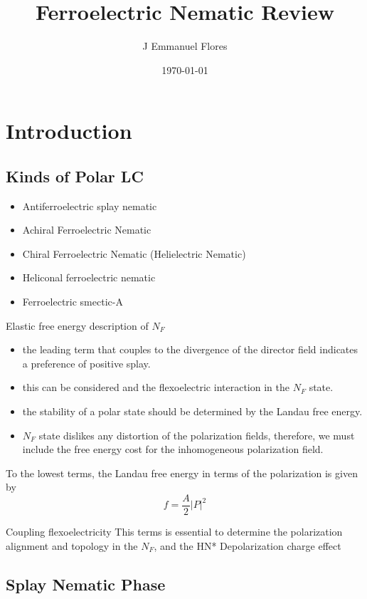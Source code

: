 \documentclass{article}
\title{Ferroelectric Nematic Review}
\author{J Emmanuel Flores}
\date{\today}
\begin{document}
\maketitle

\section{Introduction}
\subsection{Kinds of Polar LC \cite{zou2024extended}}
\begin{itemize}
    \item Antiferroelectric splay nematic
    \item Achiral Ferroelectric Nematic
    \item Chiral Ferroelectric Nematic (Helielectric Nematic)
    \item Heliconal ferroelectric nematic
    \item Ferroelectric smectic-A
\end{itemize}
Elastic free energy description of $N_{F}$
\begin{itemize}
    \item the leading term that couples to the divergence of the director field indicates a preference of positive splay.
    \item this can be considered and the flexoelectric interaction in the $N_{F}$ state.
    \item the stability of  a polar state should be determined by the Landau free energy.
    \item $N_{F}$ state dislikes any distortion of the polarization fields, therefore, we must include the free energy cost for the inhomogeneous polarization field.
\end{itemize}
To the lowest terms, the Landau free energy in terms of the polarization is given by 
\begin{equation}
    f=\frac{A}{2}|P|^2
\end{equation}

Coupling flexoelectricity
This terms is essential to determine the polarization alignment and topology in the $N_{F}$, and the HN*
Depolarization charge effect

\subsection{Splay Nematic Phase\cite{mertelj2018splay}}
\end{document}

